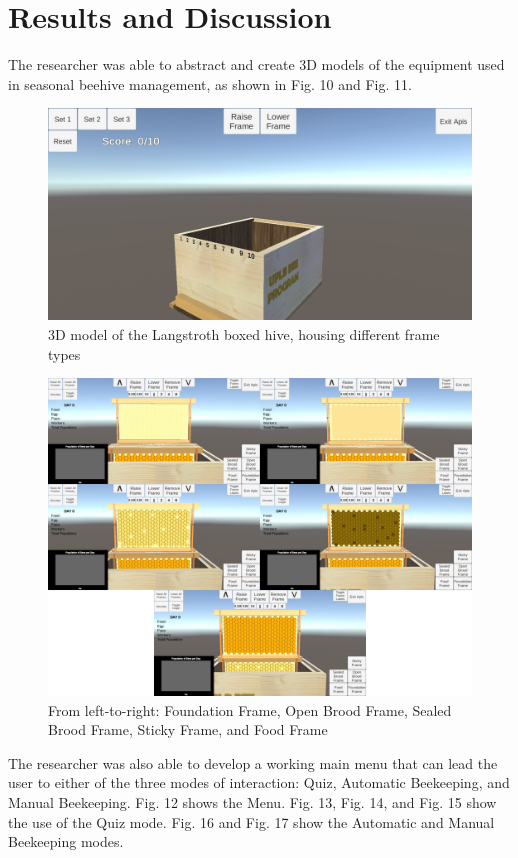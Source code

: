 \documentclass[journal]{./IEEE/IEEEtran}
\begin{document}
\section{Results and Discussion}
\indent The researcher was able to abstract and create 3D models of the equipment used in seasonal beehive management, as shown in Fig. 10 and Fig. 11.
\begin{figure}[H]
\includegraphics[scale=0.17]{./images/beehive-box-new.jpg}
\centering
\caption{3D model of the Langstroth boxed hive, housing different frame types}
\end{figure}
\begin{figure}[H]
\includegraphics[scale=0.29]{./images/frame-types-new.png}
\centering
\caption{From left-to-right: Foundation Frame, Open Brood Frame, Sealed Brood Frame, Sticky Frame, and Food Frame}
\end{figure}
\indent The researcher was also able to develop a working main menu that can lead the user to either of the three modes of interaction: Quiz, Automatic Beekeeping, and Manual Beekeeping. Fig. 12 shows the Menu. Fig. 13, Fig. 14, and Fig. 15 show the use of the Quiz mode. Fig. 16 and Fig. 17 show the Automatic and Manual Beekeeping modes. 
\end{document}

